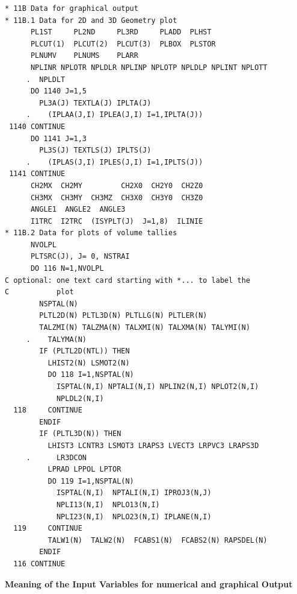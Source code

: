 \begin{lstlisting}
* 11B Data for graphical output
* 11B.1 Data for 2D and 3D Geometry plot
      PL1ST     PL2ND     PL3RD     PLADD  PLHST
      PLCUT(1)  PLCUT(2)  PLCUT(3)  PLBOX  PLSTOR
      PLNUMV    PLNUMS    PLARR
      NPLINR NPLOTR NPLDLR NPLINP NPLOTP NPLDLP NPLINT NPLOTT
     .  NPLDLT
      DO 1140 J=1,5
        PL3A(J) TEXTLA(J) IPLTA(J)
     .    (IPLAA(J,I) IPLEA(J,I) I=1,IPLTA(J))
 1140 CONTINUE
      DO 1141 J=1,3
        PL3S(J) TEXTLS(J) IPLTS(J)
     .    (IPLAS(J,I) IPLES(J,I) I=1,IPLTS(J))
 1141 CONTINUE
      CH2MX  CH2MY         CH2X0  CH2Y0  CH2Z0
      CH3MX  CH3MY  CH3MZ  CH3X0  CH3Y0  CH3Z0
      ANGLE1  ANGLE2  ANGLE3
      I1TRC  I2TRC  (ISYPLT(J)  J=1,8)  ILINIE
* 11B.2 Data for plots of volume tallies
      NVOLPL
      PLTSRC(J), J= 0, NSTRAI
      DO 116 N=1,NVOLPL
C optional: one text card starting with *... to label the
C           plot
        NSPTAL(N)
        PLTL2D(N) PLTL3D(N) PLTLLG(N) PLTLER(N)
        TALZMI(N) TALZMA(N) TALXMI(N) TALXMA(N) TALYMI(N)
     .    TALYMA(N)
        IF (PLTL2D(NTL)) THEN
          LHIST2(N) LSMOT2(N)
          DO 118 I=1,NSPTAL(N)
            ISPTAL(N,I) NPTALI(N,I) NPLIN2(N,I) NPLOT2(N,I)
            NPLDL2(N,I)
  118     CONTINUE
        ENDIF
        IF (PLTL3D(N)) THEN
          LHIST3 LCNTR3 LSMOT3 LRAPS3 LVECT3 LRPVC3 LRAPS3D
     .      LR3DCON
          LPRAD LPPOL LPTOR
          DO 119 I=1,NSPTAL(N)
            ISPTAL(N,I)  NPTALI(N,I) IPROJ3(N,J)
            NPLI13(N,I)  NPLO13(N,I)
            NPLI23(N,I)  NPLO23(N,I) IPLANE(N,I)
  119     CONTINUE
          TALW1(N)  TALW2(N)  FCABS1(N)  FCABS2(N) RAPSDEL(N)
        ENDIF
  116 CONTINUE
\end{lstlisting}

\medskip

\textbf{Meaning of the Input Variables for numerical and graphical Output}

\medskip

